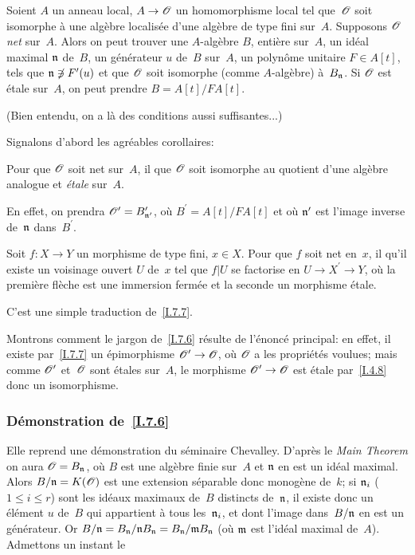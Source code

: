 \begin{theoreme}
\label{I.7.6}
Soient $A$ un anneau local, $A \to \cal{O}$ un homomorphisme local tel
que~$\cal{O}$ soit isomorphe \`a une alg\`ebre localis\'ee d'une
alg\`ebre de type fini sur~$A$. Supposons
$\cal{O}$
\emph{net} sur~$A$. Alors on peut trouver une $A$-alg\`ebre $B$,
enti\`ere sur~$A$, un id\'eal maximal $\mathfrak{n}$ de~$B$, un
g\'en\'erateur $u$ de~$B$ sur~$A$, un polyn\^ome unitaire $F\in
A[t]$, tels que $\mathfrak{n} \not\ni F^\prime(u)$ et que $\cal{O}$ soit
isomorphe (comme $A$-alg\`ebre) \`a~$B_{\mathfrak{n}}$. Si $\cal{O}$
est \'etale sur~$A$, on peut prendre $B=A[t]/FA[t]$.
\end{theoreme}

(Bien entendu, on a l\`a des conditions aussi suffisantes...)

Signalons d'abord les agr\'eables corollaires:

\begin{corollaire}
\label{I.7.7}
Pour que $\cal{O}$ soit net sur~$A$, il \fets que $\cal{O}$ soit
isomorphe au quotient d'une alg\`ebre analogue et \emph{étale}
sur~$A$.
\end{corollaire}

En effet, on prendra $\cal{O}^\prime = B^\prime_{\goth{n}^\prime}$,
o\`u $B^\prime = A[t]/FA[t]$ et o\`u $\mathfrak{n}^\prime$ est l'image
inverse de~$\mathfrak{n}$ dans~$B^\prime$.

\begin{corollaire}
\label{I.7.8}
Soit
$f\colon X \to Y$ un morphisme de type fini, $x\in X$. Pour que
$f$ soit net en~$x$, il \fets qu'il existe un voisinage ouvert
$U$ de~$x$ tel que $f|U$ se factorise en $U \to X^\prime \to Y$,
o\`u la premi\`ere fl\`eche est une immersion ferm\'ee et la
seconde un morphisme \'etale.
\end{corollaire}

C'est une simple traduction de~\ref{I.7.7}.

Montrons comment le jargon de~\ref{I.7.6} r\'esulte de
l'\'enonc\'e principal: en effet, il existe par~\ref{I.7.7} un
\'epimorphisme $\cal{O}^\prime \to \cal{O}$, o\`u $\cal{O}$ a les
propri\'et\'es voulues; mais comme $\cal{O}^\prime$ et~$\cal{O}$
sont \'etales sur~$A$, le morphisme $\cal{O}^\prime \to \cal{O}$ est
\'etale par~\ref{I.4.8} donc un isomorphisme.

\subsubsection*{D\'emonstration de~\ref{I.7.6}}
Elle reprend une d\'emonstration du s\'eminaire
Chevalley. D'apr\`es le \emph{Main Theorem} on aura $\cal{O} =
B_{\goth{n}}$, o\`u $B$ est une alg\`ebre finie sur~$A$ et
$\mathfrak{n}$ en est un id\'eal maximal. Alors $B/\goth{n} =
K(\cal{O})$ est une extension s\'eparable donc monog\`ene de~$k$;
si $\mathfrak{n}_i$ ($1 \leq i \leq r$) sont les id\'eaux maximaux
de~$B$ distincts de~$\mathfrak{n}$, il existe donc un \'el\'ement $u$
de~$B$ qui appartient \`a tous les~$\mathfrak{n}_i$, et dont l'image
dans~$B/\mathfrak{n}$ en est un g\'en\'erateur. Or $B/\mathfrak{n} =
B_\mathfrak{n}/\mathfrak{n} B_\mathfrak{n} = B_\mathfrak{n}/\mathfrak{m} B_\mathfrak{n}$
(o\`u $\mathfrak{m}$ est l'id\'eal maximal de~$A$). Admettons un
instant le

